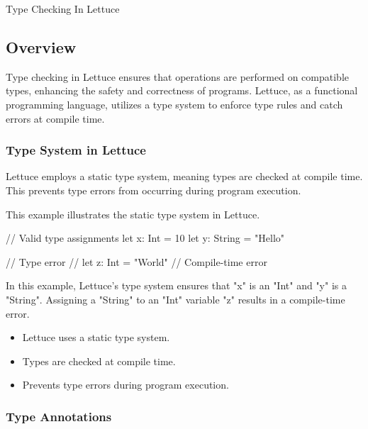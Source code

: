 \begin{notes}{Type Checking In Lettuce}
    \subsection*{Overview}

    Type checking in Lettuce ensures that operations are performed on compatible types, enhancing the safety and correctness of programs. Lettuce, as a functional programming language, utilizes a type 
    system to enforce type rules and catch errors at compile time.
    
    \subsubsection*{Type System in Lettuce}
    
    Lettuce employs a static type system, meaning types are checked at compile time. This prevents type errors from occurring during program execution.
    
    \begin{highlight}
    
        This example illustrates the static type system in Lettuce.
    
    \begin{code}[Lettuce]
    // Valid type assignments
    let x: Int = 10
    let y: String = "Hello"
    
    // Type error
    // let z: Int = "World"  // Compile-time error
    \end{code}
    
        In this example, Lettuce's type system ensures that "x" is an "Int" and "y" is a "String". Assigning a "String" to an "Int" variable "z" results in a compile-time error.
    
        \begin{itemize}
            \item Lettuce uses a static type system.
            \item Types are checked at compile time.
            \item Prevents type errors during program execution.
        \end{itemize}
    
    \end{highlight}
    
    \subsubsection*{Type Annotations}
    

\end{notes}
